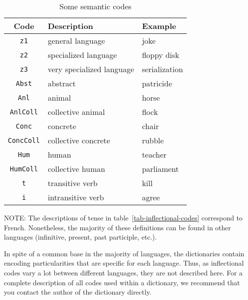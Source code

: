\begin{table}[!ht]
\begin{center}
\begin{tabular}{|c|l|l|}
\hline
\textbf{Code} & \textbf{Description} & \textbf{Example} \\
\hline
\verb+z1+ & general language & joke \\
\hline
\verb+z2+ & specialized language & floppy disk \\
\hline
\verb+z3+ & very specialized language & serialization \\
\hline
\verb+Abst+ & abstract & patricide \\
\hline
\verb+Anl+ & animal & horse \\
\hline
\verb+AnlColl+ & collective animal & flock \\
\hline
\verb+Conc+ & concrete & chair \\
\hline
\verb+ConcColl+ & collective concrete & rubble \\
\hline
\verb+Hum+ & human & teacher \\
\hline
\verb+HumColl+ & collective human & parliament \\
\hline
\verb+t+ & transitive verb & kill \\
\hline
\verb+i+ & intransitive verb & agree \\
\hline
\end{tabular}
\caption{Some semantic codes\label{tab-semantic-codes}}
\end{center}
\end{table}

\bigskip
\noindent NOTE: The  descriptions of tense in
table~\ref{tab-inflectional-codes} correspond to French.
Nonetheless, the majority of these definitions can be found in other languages (infinitive, present, past participle, etc.).

\bigskip
\noindent In spite of a common base in the majority of languages, the dictionaries
contain encoding particularities that are specific for each language. Thus, as
inflectional codes vary a lot between different languages, they are not
described here. For a complete description of all codes used within a dictionary,
we recommend that you  contact the author of the dictionary directly.

